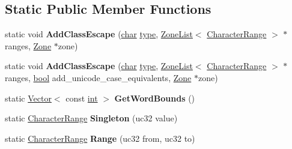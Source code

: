 \subsection*{Static Public Member Functions}
\begin{DoxyCompactItemize}
\item 
\mbox{\label{classv8_1_1internal_1_1CharacterRange_a91f845cc383cc9802b1281c636cdf880}} 
static void {\bfseries Add\+Class\+Escape} (\mbox{\hyperlink{classchar}{char}} \mbox{\hyperlink{classstd_1_1conditional_1_1type}{type}}, \mbox{\hyperlink{classv8_1_1internal_1_1ZoneList}{Zone\+List}}$<$ \mbox{\hyperlink{classv8_1_1internal_1_1CharacterRange}{Character\+Range}} $>$ $\ast$ranges, \mbox{\hyperlink{classv8_1_1internal_1_1Zone}{Zone}} $\ast$zone)
\item 
\mbox{\label{classv8_1_1internal_1_1CharacterRange_a41bcaf098fa2ebbb726c162a182759d6}} 
static void {\bfseries Add\+Class\+Escape} (\mbox{\hyperlink{classchar}{char}} \mbox{\hyperlink{classstd_1_1conditional_1_1type}{type}}, \mbox{\hyperlink{classv8_1_1internal_1_1ZoneList}{Zone\+List}}$<$ \mbox{\hyperlink{classv8_1_1internal_1_1CharacterRange}{Character\+Range}} $>$ $\ast$ranges, \mbox{\hyperlink{classbool}{bool}} add\+\_\+unicode\+\_\+case\+\_\+equivalents, \mbox{\hyperlink{classv8_1_1internal_1_1Zone}{Zone}} $\ast$zone)
\item 
\mbox{\label{classv8_1_1internal_1_1CharacterRange_a6bfe19b63871347a50b077122d9dc8c2}} 
static \mbox{\hyperlink{classv8_1_1internal_1_1Vector}{Vector}}$<$ const \mbox{\hyperlink{classint}{int}} $>$ {\bfseries Get\+Word\+Bounds} ()
\item 
\mbox{\label{classv8_1_1internal_1_1CharacterRange_a6c3ef8e750a0d1b8b4a1bf76fc423f1f}} 
static \mbox{\hyperlink{classv8_1_1internal_1_1CharacterRange}{Character\+Range}} {\bfseries Singleton} (uc32 value)
\item 
\mbox{\label{classv8_1_1internal_1_1CharacterRange_a32b358e230887d725cff947f04fcc928}} 
static \mbox{\hyperlink{classv8_1_1internal_1_1CharacterRange}{Character\+Range}} {\bfseries Range} (uc32 from, uc32 to)
\item 

\end{DoxyCompactItemize}
